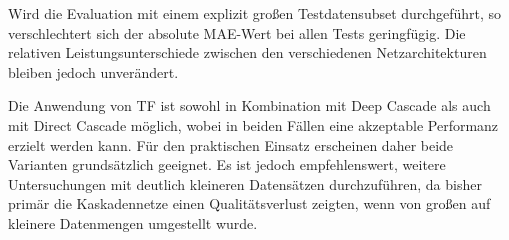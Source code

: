 Wird die Evaluation mit einem explizit großen Testdatensubset durchgeführt, so verschlechtert sich der absolute MAE-Wert bei allen Tests 
geringfügig. Die relativen Leistungsunterschiede zwischen den verschiedenen Netzarchitekturen bleiben jedoch unverändert.

Die Anwendung von TF ist sowohl in Kombination mit Deep Cascade als auch mit Direct Cascade möglich, wobei in beiden Fällen eine akzeptable 
Performanz erzielt werden kann. Für den praktischen Einsatz erscheinen daher beide Varianten grundsätzlich geeignet. Es ist jedoch 
empfehlenswert, weitere Untersuchungen mit deutlich kleineren Datensätzen durchzuführen, da bisher primär die Kaskadennetze einen 
Qualitätsverlust zeigten, wenn von großen auf kleinere Datenmengen umgestellt wurde.
